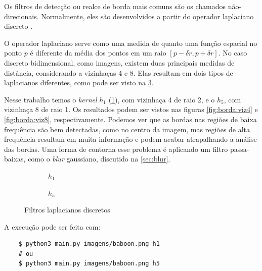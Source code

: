 Os filtros de detecção ou realce de borda mais comuns são os chamados não-direcionais. Normalmente, eles são desenvolvidos a partir do operador laplaciano discreto \autocite{ref:laplacian}.

O operador laplaciano serve como uma medida de quanto uma função espacial no ponto $p$ é diferente da média dos pontos em um raio $[p - \delta r, p + \delta r]$. No caso discreto bidimensional, como imagens, existem duas principais medidas de distância, considerando a vizinhaças 4 e 8. Elas resultam em dois tipos de laplacianos diferentes, como pode ser visto na \cref{fig:borda:kernel}.

Nesse trabalho temos o \textit{kernel} $h_1$ (\ref{fig:h1}), com vizinhaça 4 de raio 2, e o $h_5$, com vizinhaça 8 de raio 1. Os resultados podem ser vistos nas figuras \ref{fig:borda:viz4} e \ref{fig:borda:viz8}, respectivamente. Podemos ver que as bordas nas regiões de baixa frequência são bem detectadas, como no centro da imagem, mas regiões de alta frequência resultam em muita informação e podem acabar atrapalhando a análise das bordas. Uma forma de contorna esse problema é aplicando um filtro passa-baixas, como o \textit{blur} gaussiano, discutido na \cref{sec:blur}.

\begin{figure}[H]
    \centering
    \begin{subfigure}{0.4\textwidth}
        \centering
        
        \caption{~$h_1$}
        \label{fig:h1}
    \end{subfigure}%
    \begin{subfigure}{0.4\textwidth}
        \centering
        
        \caption{~$h_5$}
        \label{fig:h5}
    \end{subfigure}

    \caption{Filtros laplacianos discretos}
    \label{fig:borda:kernel}
\end{figure}

A execução pode ser feita com:

\begin{verbatim}
    $ python3 main.py imagens/baboon.png h1
    # ou
    $ python3 main.py imagens/baboon.png h5
\end{verbatim}
